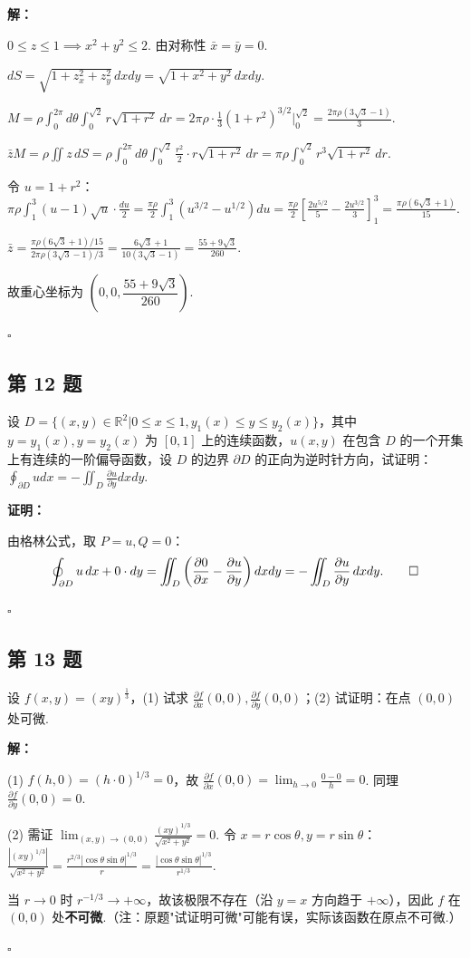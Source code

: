 \documentclass[12pt,a4paper]{article}
\newenvironment{sol}[1][解]{%
  \par\medskip\noindent\textbf{#1：}\itshape\par\noindent\ignorespaces
}{%
  \par\hfill$\square$\par\medskip
}
\begin{document}
\begin{sol}$0\le z\le 1\implies x^2+y^2\le 2$. 由对称性 $\bar{x}=\bar{y}=0$.

  $dS=\sqrt{1+z_x^2+z_y^2}\,dxdy=\sqrt{1+x^2+y^2}\,dxdy.$

  $M=\rho\int_0^{2\pi}d\theta\int_0^{\sqrt{2}}r\sqrt{1+r^2}\,dr=2\pi\rho\cdot\frac{1}{3}(1+r^2)^{3/2}\Big|_0^{\sqrt{2}}=\frac{2\pi\rho(3\sqrt{3}-1)}{3}.$

  $\bar{z}M=\rho\iint
  z\,dS=\rho\int_0^{2\pi}d\theta\int_0^{\sqrt{2}}\frac{r^2}{2}\cdot
  r\sqrt{1+r^2}\,dr
  =\pi\rho\int_0^{\sqrt{2}}r^3\sqrt{1+r^2}\,dr.$

  令 $u=1+r^2$：
  $\pi\rho\int_1^3(u-1)\sqrt{u}\cdot\frac{du}{2}=\frac{\pi\rho}{2}\int_1^3(u^{3/2}-u^{1/2})du=\frac{\pi\rho}{2}\left[\frac{2u^{5/2}}{5}-\frac{2u^{3/2}}{3}\right]_1^3=\frac{\pi\rho(6\sqrt{3}+1)}{15}.$

  $\bar{z}=\frac{\pi\rho(6\sqrt{3}+1)/15}{2\pi\rho(3\sqrt{3}-1)/3}=\frac{6\sqrt{3}+1}{10(3\sqrt{3}-1)}=\frac{55+9\sqrt{3}}{260}.$

  故重心坐标为 $\left(0,0,\dfrac{55+9\sqrt{3}}{260}\right)$.

\end{sol}
\subsection*{第 12 题}
设 $D=\{(x,y)\in\mathbb{R}^2|0\le x\le 1, y_1(x)\le y\le y_2(x)\}$，其中
$y=y_1(x), y=y_2(x)$ 为 $[0,1]$ 上的连续函数，$u(x,y)$ 在包含 $D$
的一个开集上有连续的一阶偏导函数，设 $D$ 的边界 $\partial D$
的正向为逆时针方向，试证明：$\oint_{\partial D}udx=-\iint_{D}\frac{\partial
u}{\partial y}dxdy$.

\begin{sol}[证明]由格林公式，取 $P=u, Q=0$：
  $$\oint_{\partial D}u\,dx+0\cdot dy=\iint_D\left(\frac{\partial
    0}{\partial x}-\frac{\partial u}{\partial
  y}\right)dxdy=-\iint_D\frac{\partial u}{\partial y}\,dxdy.\qed$$

\end{sol}
\subsection*{第 13 题}
设 $f(x,y)=(xy)^{\frac{1}{3}}$，(1) 试求 $\frac{\partial f}{\partial
x}(0,0), \frac{\partial f}{\partial y}(0,0)$；(2) 试证明：在点 $(0,0)$ 处可微.

\begin{sol}(1) $f(h,0)=(h\cdot 0)^{1/3}=0$，故 $\frac{\partial
  f}{\partial x}(0,0)=\lim_{h\to 0}\frac{0-0}{h}=0$. 同理 $\frac{\partial
  f}{\partial y}(0,0)=0$.

  (2) 需证 $\lim_{(x,y)\to(0,0)}\frac{(xy)^{1/3}}{\sqrt{x^2+y^2}}=0$. 令
  $x=r\cos\theta,y=r\sin\theta$：
  $\frac{|(xy)^{1/3}|}{\sqrt{x^2+y^2}}=\frac{r^{2/3}|\cos\theta\sin\theta|^{1/3}}{r}=\frac{|\cos\theta\sin\theta|^{1/3}}{r^{1/3}}.$

  当 $r\to 0$ 时 $r^{-1/3}\to+\infty$，故该极限不存在（沿 $y=x$ 方向趋于 $+\infty$），因此
  $f$ 在 $(0,0)$ 处\textbf{不可微}.（注：原题"试证明可微"可能有误，实际该函数在原点不可微.）

\end{sol}
\end{document}
